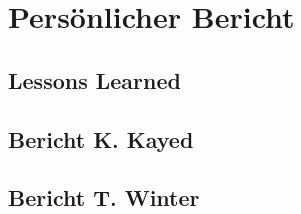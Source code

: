 \section{Persönlicher Bericht}
\label{Persönlicher Bericht}

\subsection{Lessons Learned}


\subsection{Bericht K. Kayed}


\subsection{Bericht T. Winter}

